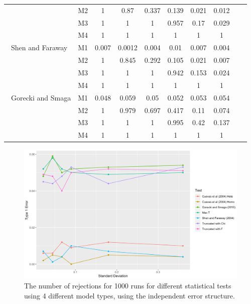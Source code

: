 \documentclass[12pt]{article}
\begin{document}
{\begin{table}[H]
\begin{tabular}{l l c c c c c c c c}
                                 & M2 & 1&	0.87&	0.337&	0.139&	0.021&	0.012    \\
                                 & M3 & 1&	1&	1&	0.957&	0.17&	0.029    \\
                                 & M4 & 1  & 1   & 1   & 1   & 1   & 1   \\\hline
             \ Shen and Faraway  & M1 & 0.007&	0.0012&	0.004&	0.01&	0.007&	0.004  \\
                                 & M2 & 1&	0.845&	0.292&	0.105&	0.021&	0.007  \\
                                 & M3 & 1&	1&	1&	0.942&	0.153&	0.024 \\
                                 & M4 & 1  & 1 & 1 & 1 & 1 & 1 &  \\\hline
            \ Gorecki and Smaga  & M1 & 0.048&	0.059&	0.05&	0.052&	0.053&	0.054  \\
                                 & M2 & 1&	0.979&	0.697&	0.417&	0.11&	0.074    \\
                                 & M3 & 1&	1&	1&	0.995&	0.42&	0.137    \\
                                 & M4 & 1  & 1   & 1   & 1   & 1   & 1   \\\hline
        \end{tabular}
          \end{table}
}

    \begin{figure}[H]
        \centering
        \includegraphics[scale=0.3]{Type_1_Error_Independent.png}
        \caption{The number of rejections for 1000 runs for different statistical tests using 4
        different model types, using the independent error structure.}
    \end{figure}
\end{document}
